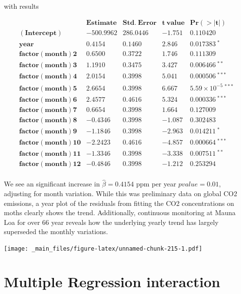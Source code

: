 \documentclass[
]{book}
\begin{document}
with results

\[
\begin{array}{lcccc}
 & \mathbf{Estimate} & \mathbf{Std.\ Error} & \mathbf{t\ value} & \mathbf{Pr(>|t|)} \\ 
\mathbf{(Intercept)}    & -500.9962 & 286.0446 & -1.751 & 0.110420 \\
\mathbf{year}           & 0.4154 & 0.1460 & 2.846 & 0.017383 \ ^{*} \\
\mathbf{factor(month)2} & 0.6500 & 0.3722 & 1.746 & 0.111309 \\
\mathbf{factor(month)3} & 1.1910 & 0.3475 & 3.427 & 0.006466 \ ^{**} \\
\mathbf{factor(month)4} & 2.0154 & 0.3998 & 5.041 & 0.000506 \ ^{***} \\
\mathbf{factor(month)5} & 2.6654 & 0.3998 & 6.667 & 5.59 \times 10^{-5} \ ^{***} \\
\mathbf{factor(month)6} & 2.4577 & 0.4616 & 5.324 & 0.000336 \ ^{***} \\
\mathbf{factor(month)7} & 0.6654 & 0.3998 & 1.664 & 0.127009 \\
\mathbf{factor(month)8} & -0.4346 & 0.3998 & -1.087 & 0.302483 \\
\mathbf{factor(month)9} & -1.1846 & 0.3998 & -2.963 & 0.014211 \ ^{*} \\
\mathbf{factor(month)10}& -2.2423 & 0.4616 & -4.857 & 0.000664 \ ^{***} \\
\mathbf{factor(month)11}& -1.3346 & 0.3998 & -3.338 & 0.007511 \ ^{**} \\
\mathbf{factor(month)12}& -0.4846 & 0.3998 & -1.212 & 0.253294 \\
\end{array}
\]

We see an significant increase in \(\hat{\beta}=0.4154\) ppm per year \(pvalue=0.01\), adjusting for month variation. While this was preliminary data on global CO2 emissions, a year plot of the residuals from fitting the CO2 concentrations on moths clearly shows the trend. Additionally, continuous monitoring at Mauna Loa for over 66 year reveals how the underlying yearly trend has largely superseded the monthly variations.

\texttt{[image: \_main\_files/figure-latex/unnamed-chunk-215-1.pdf]}

\hypertarget{multiple-regression-interaction}{%
\section{Multiple Regression interaction}\label{multiple-regression-interaction}}
\end{document}
